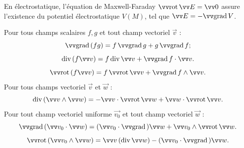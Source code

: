 \begin{remarque}
  En électrostatique, l'équation de Maxwell-Faraday $\rot \E = \Vec{0}$ assure l'existence du potentiel électrostatique $V(M)$, tel que $\E = - \grad{V}$.
\end{remarque}



Pour tous champs scalaires $f, g$ et tout champ vectoriel $\Vec{v}$ :
$$
\grad (f g ) =f \, \grad g + g \, \grad f ;
$$
$$
\dive (f \Vec{v} ) =f \, \dive \Vec{v} +  \grad f \ps \Vec{v}.
$$
$$
\rot (f \Vec{v} ) =f \, \rot \Vec{v} + \grad f \pv \Vec{v}.
$$
Pour tous champs vectoriel $\Vec{v}$  et $\Vec{w}$ :
$$
\dive ( \Vec{v} \pv \Vec{w} ) = - \Vec{v} \ps \rot \Vec{w} + \Vec{w} \ps \rot \Vec{v}.
$$
Pour tout champ vectoriel uniforme $\Vec{v_0}$ et tout champ vectoriel $\Vec{w}$ :
$$
\grad ( \Vec{v_0} \ps \Vec{w} ) = (\Vec{v_0} \ps \grad) \Vec{w} + \Vec{v_0} \pv \rot \Vec{w}.
$$
$$
\rot ( \Vec{v_0} \pv \Vec{w} ) = \Vec{v}  \,(\dive \Vec{w}) - (\Vec{v_0} \ps \grad) \Vec{w}.
$$

